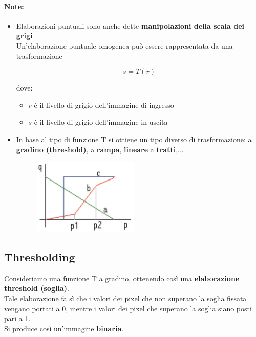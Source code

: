 \paragraph{Note:}

\begin{itemize}
    \item Elaborazioni puntuali sono anche dette \textbf{manipolazioni della scala dei
              grigi}\\
          Un'elaborazione puntuale omogenea può essere rappresentata da
          una trasformazione

          $$
              s = T(r)
          $$

          dove:
          \begin{itemize}
              \item $r$ è il livello di grigio dell'immagine di ingresso
              \item $s$ è il livello di grigio dell'immagine in uscita
          \end{itemize}
    \item In base al tipo di funzione T si ottiene un tipo diverso di
          trasformazione: a \textbf{gradino (threshold)}, a \textbf{rampa},
          \textbf{lineare} a \textbf{tratti},...

          \begin{figure}[H]
              \centering
              \includegraphics[width=5cm, keepaspectratio]{capitoli/immagini/imgs/elaborazioni_puntuali_immagine.jpg}
          \end{figure}

\end{itemize}

\subsection{Thresholding}

Consideriamo una funzione T a gradino, ottenendo così una
\textbf{elaborazione threshold (soglia)}.\\
Tale elaborazione fa sì che i valori dei pixel che non superano la
soglia fissata vengano portati a 0, mentre i valori dei pixel che
superano la soglia siano posti pari a 1.\\
Si produce così un'immagine \textbf{binaria}.

